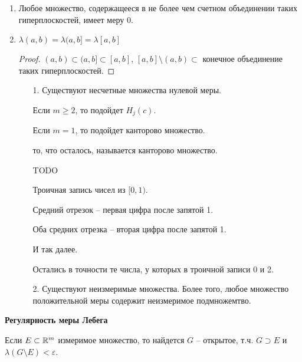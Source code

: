 \begin{enumerate}
\begin{proof}
        Достаточно проверить, что $\lambda A_n =0$: $A_n\subset (-n, n]\times ...\times (-n, n] \times (c - \varepsilon, c)
        \times (-n, n]\times ...\times (-n, n]\Rightarrow \lambda A_n\leq (2n)^{m-1}\cdot \varepsilon$
    \end{proof}

    \item Любое множество, содержащееся в не более чем счетном объединении таких гиперплоскостей, имеет меру 0.
    
    \item $\lambda (a, b) =\lambda (a, b] = \lambda [a, b]$
    
    \begin{proof}
        $(a, b)\subset (a, b]\subset [a, b]$, $[a, b]\setminus (a, b) \subset$ конечное 
        объединение таких гиперплоскостей.
    \end{proof}

    \begin{remark}
        \begin{enumerate}
            \item[1.] Существуют несчетные множества нулевой меры.
            
            Если $m\geq 2$, то подойдет $H_j(c)$.

            Если $m= 1$, то подойдет канторово множество.

            то, что осталось, называется канторово множество.

            TODO

            Троичная запись чисел из $[0, 1)$. 
            
            Средний отрезок – первая цифра после запятой 1.

            Оба средних отрезка – вторая цифра после запятой 1.

            И так далее.

            Остались в точности те числа, у которых в троичной записи 0 и 2.

            \item[2.] Существуют неизмеримые множества. Более того, любое множество положительной
            меры содержит неизмеримое подмножемтво.
        \end{enumerate}
    \end{remark}
\end{enumerate}

\begin{theorem}
    \textbf{Регулярность меры Лебега}

    Если $E\subset \mathbb{R}^m$ измеримое множество, то найдется $G$ – открытое, т.ч. $G\supset E$ и $\lambda (G\setminus E) < \varepsilon$.
\end{theorem}


